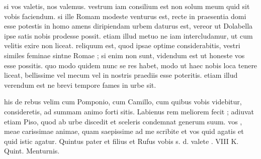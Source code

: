 


 si vos valetis, nos valemus. vestrum iam consilium est non solum meum quid sit vobis faciendum. si ille Romam modeste venturus est, recte in praesentia domi esse potestis in homo amens diripiendam urbem daturus est, vereor ut Dolabella ipse satis nobis prodesse possit. etiam illud metuo ne iam intercludamur, ut cum velitis exire non liceat. reliquum est, quod ipsae optime considerabitis, vestri similes feminae sintne Romae ; si enim non sunt, videndum est ut honeste vos esse possitis. quo modo quidem nunc se res habet, modo ut haec nobis loca tenere liceat, bellissime vel mecum vel in nostris praediis esse poteritis. etiam illud verendum est ne brevi tempore fames in urbe sit.

 his de rebus velim cum Pomponio, cum Camillo, cum quibus vobis videbitur, consideretis, ad summam animo forti sitis. Labienus rem meliorem fecit ; adiuvat etiam Piso, quod ab urbe discedit et sceleris condemnat generum suum. vos , meae carissimae animae, quam saepissime ad me scribite et vos quid agatis et quid istic agatur. Quintus pater et filius et Rufus vobis s. d. valete . VIII K. Quint. Menturnis.
